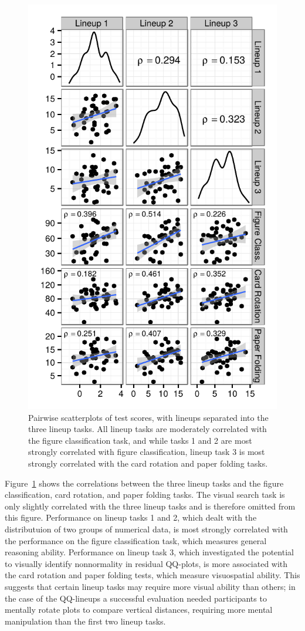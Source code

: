 \documentclass[11pt]{isuthesis}\usepackage[]{graphicx}\usepackage[]{color}
\begin{document}
\begin{figure}[ht]\centering
\includegraphics[width=.5\linewidth]{fig-LineupTypeSPM-1}
\caption{Pairwise scatterplots of test scores, with lineups separated into the three lineup tasks. All lineup tasks are moderately correlated with the figure classification task, and while tasks 1 and 2 are most strongly correlated with figure classification, lineup task 3 is most strongly correlated with the card rotation and paper folding tasks. \label{fig:lineuptaskmatrix}}
\end{figure}
Figure~\ref{fig:lineuptaskmatrix} shows the correlations between the three lineup tasks and the figure classification, card rotation, and paper folding tasks. The visual search task is only slightly correlated with the three lineup tasks and is therefore omitted from this figure. Performance on lineup tasks 1 and 2, which dealt with the distributuion of two groups of numerical data, is most strongly correlated with the performance on the figure classification task, which measures general reasoning ability.
Performance on lineup task 3, which investigated the potential to visually identify nonnormality in residual QQ-plots, is more associated with the card rotation and paper folding tests, which measure visuospatial ability. This suggests that certain lineup tasks may require more visual ability than others; in the case of the QQ-lineups a successful evaluation  needed  participants to mentally rotate plots to compare vertical distances, requiring more mental manipulation than the first two lineup tasks.
\end{document}
